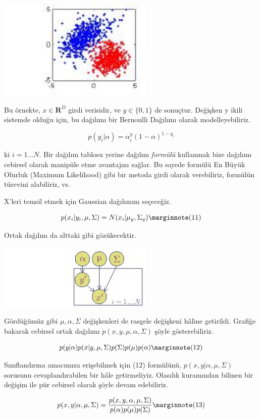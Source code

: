 \documentclass[12pt,fleqn]{article}\usepackage{../../common}
\begin{document}
\includegraphics[width=20em]{gaussdata.jpg}

Bu örnekte, $x \in \mathbf{R}^D$ girdi verisidir, ve $y \in \{0,1\}$ de
sonuçtur. Değişken y ikili sistemde olduğu için, bu dağılımı bir Bernoulli
Dağılımı olarak modelleyebiliriz.

$$
p(y_{i}|\alpha)=\alpha^y_{i}(1-\alpha)^{1-y_{i}}
$$
  
ki $i=1...N$. Bir dağılım tablosu yerine dağılım {\em formülü} kullanmak
bize dağılımı cebirsel olarak manipüle etme avantajını sağlar. Bu sayede
formülü En Büyük Olurluk (Maximum Likelihood) gibi bir metoda girdi olarak
verebiliriz, formülün türevini alabiliriz, vs.

X'leri temsil etmek için Gaussian dağılımını seçeceğiz. 

$$
p(x_{i}|y_{i},\mu,\Sigma)=N(x_{i}|\mu_{y},\Sigma_{y})  
\mlabel{11}
$$

Ortak dağılım da alttaki gibi gözükecektir. 

\includegraphics[width=20em]{gauss_repl_plate.jpg}

Gördüğümüz gibi $\mu,\alpha,\Sigma$ değişkenleri de rasgele değişkeni hâline
getirildi. Grafiğe bakarak cebirsel ortak dağılımı $p(x,y,\mu,\alpha,\Sigma)$
şöyle gösterebiliriz.

$$
p(y|\alpha)p(x|y,\mu,\Sigma)p(\Sigma)p(\mu)p(\alpha) 
\mlabel{12}
$$

Sınıflandırma amacımıza erişebilmek için (12) formülünü,
$p(x,y|\alpha,\mu,\Sigma)$ sorusunu cevaplandırabilen bir hâle
getirmeliyiz. Olasılık kuramından bilinen bir değişim ile pür cebirsel
olarak şöyle devam edebiliriz.

$$
p(x,y|\alpha,\mu,\Sigma) =
\frac{p(x,y,\alpha,\mu,\Sigma)}
     {p(\alpha)p(\mu)p(\Sigma)} 
\mlabel{13}
$$
\end{document}
